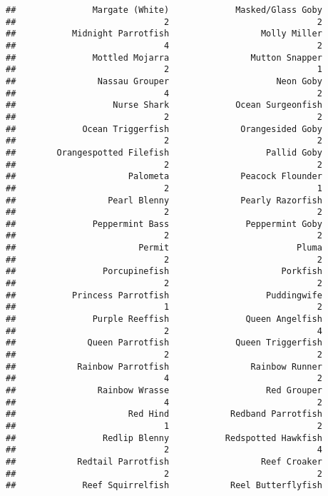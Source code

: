 \documentclass[
]{article}
\begin{document}
\begin{verbatim}
##               Margate (White)             Masked/Glass Goby 
##                             2                             2 
##           Midnight Parrotfish                  Molly Miller 
##                             4                             2 
##               Mottled Mojarra                Mutton Snapper 
##                             2                             1 
##                Nassau Grouper                     Neon Goby 
##                             4                             2 
##                   Nurse Shark             Ocean Surgeonfish 
##                             2                             2 
##             Ocean Triggerfish              Orangesided Goby 
##                             2                             2 
##        Orangespotted Filefish                   Pallid Goby 
##                             2                             2 
##                      Palometa              Peacock Flounder 
##                             2                             1 
##                  Pearl Blenny              Pearly Razorfish 
##                             2                             2 
##               Peppermint Bass               Peppermint Goby 
##                             2                             2 
##                        Permit                         Pluma 
##                             2                             2 
##                 Porcupinefish                      Porkfish 
##                             2                             2 
##           Princess Parrotfish                   Puddingwife 
##                             1                             2 
##               Purple Reeffish               Queen Angelfish 
##                             2                             4 
##              Queen Parrotfish             Queen Triggerfish 
##                             2                             2 
##            Rainbow Parrotfish                Rainbow Runner 
##                             4                             2 
##                Rainbow Wrasse                   Red Grouper 
##                             4                             2 
##                      Red Hind            Redband Parrotfish 
##                             1                             2 
##                 Redlip Blenny           Redspotted Hawkfish 
##                             2                             4 
##            Redtail Parrotfish                  Reef Croaker 
##                             2                             2 
##             Reef Squirrelfish            Reel Butterflyfish 

\end{verbatim}
\end{document}
